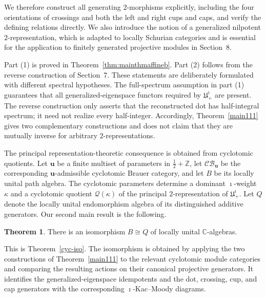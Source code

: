 \documentclass[a4,10pt]{amsart}
\numberwithin{equation}{section}
\theoremstyle{definition}
\newtheorem{THEOREM}{Theorem}
\begin{document}
We therefore construct all generating $2$-morphisms explicitly,
including the four orientations of crossings and both the left and
right cups and caps, and verify the defining relations directly.
We also introduce the notion of a generalized nilpotent
$2$-representation, which is adapted to locally Schurian categories
and is essential for the application to finitely generated projective
modules in Section~8.




Part (1) is proved in Theorem~\ref{thm:mainthmaffineb}. Part (2) follows from the reverse construction of Section~7. These statements are deliberately formulated with different spectral hypotheses. The full-spectrum assumption in part (1) guarantees that all generalized-eigenspace functors required by $\mathfrak  U^{\imath}_{+}$  are present. The reverse construction only asserts that the reconstructed dot has half-integral spectrum; it need not realize every half-integer. Accordingly, Theorem~\ref{main111} gives two complementary constructions and does not claim that they are mutually inverse for arbitrary $2$-representations.





The principal representation-theoretic consequence is obtained from cyclotomic quotients. Let $\mathbf u$ be a finite multiset of parameters in $\frac12+\mathbb Z$, let $\mathcal{CB}_{\mathbf u}$ be the corresponding $\mathbf u$-admissible cyclotomic Brauer category, and let $B$ be its locally unital path algebra. The cyclotomic parameters determine a dominant $\imath$-weight $\kappa$ and a cyclotomic quotient $\mathcal Q(\kappa)$ of the principal $2$-representation of $\mathfrak U^{\imath}_{+}$. Let $Q$ denote the locally unital endomorphism algebra of its distinguished additive generators. Our second main result is the following.

\begin{THEOREM}\label{iso-local-init} There is an isomorphism
$B\cong  Q$
of locally unital $\mathbb C$-algebras.\end{THEOREM} 

This is Theorem~\ref{cyc-iso}. The  isomorphism  is obtained by applying the two constructions  of Theorem~\ref{main111} to the relevant  cyclotomic module categories and comparing the resulting actions on their canonical projective generators. It identifies the generalized-eigenspace idempotents and the dot, crossing, cup, and cap generators with the corresponding $\imath$-Kac--Moody diagrams. 
\end{document}

